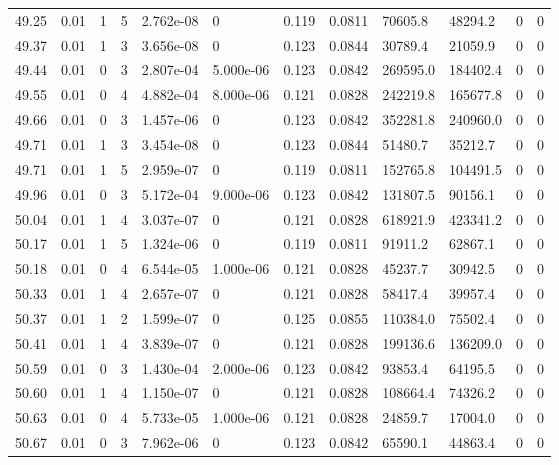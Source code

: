 \documentclass[preview]{standalone}
\begin{document}
{{{{{{{{{{{{{{\begin{tabular}{L{1.2cm}C{1.2cm} C{0.3cm}C{0.5cm} C{1.4cm}C{1.4cm} C{1.4cm}C{1.4cm} C{1.6cm}C{1.6cm} C{1.6cm}C{1.6cm}}
  49.25  &  0.01  & 1     &  5 &  2.762e-08  & 0  &  0.119&   0.0811& 70605.8 & 48294.2   &  0 & 0  \\ 
  49.37  &  0.01  & 1     &  3 &  3.656e-08  & 0  &  0.123&   0.0844& 30789.4 & 21059.9   &  0 & 0  \\ 
  49.44  &  0.01  & 0     &  3 &  2.807e-04  & 5.000e-06  &  0.123&   0.0842& 269595.0 & 184402.4   &  0 & 0  \\ 
  49.55  &  0.01  & 0     &  4 &  4.882e-04  & 8.000e-06  &  0.121&   0.0828& 242219.8 & 165677.8   &  0 & 0  \\ 
  49.66  &  0.01  & 0     &  3 &  1.457e-06  & 0  &  0.123&   0.0842& 352281.8 & 240960.0   &  0 & 0  \\ 
  49.71  &  0.01  & 1     &  3 &  3.454e-08  & 0  &  0.123&   0.0844& 51480.7 & 35212.7   &  0 & 0  \\ 
  49.71  &  0.01  & 1     &  5 &  2.959e-07  & 0  &  0.119&   0.0811& 152765.8 & 104491.5   &  0 & 0  \\ 
  49.96  &  0.01  & 0     &  3 &  5.172e-04  & 9.000e-06  &  0.123&   0.0842& 131807.5 & 90156.1   &  0 & 0  \\ 
  50.04  &  0.01  & 1     &  4 &  3.037e-07  & 0  &  0.121&   0.0828& 618921.9 & 423341.2   &  0 & 0  \\ 
  50.17  &  0.01  & 1     &  5 &  1.324e-06  & 0  &  0.119&   0.0811& 91911.2 & 62867.1   &  0 & 0  \\ 
  50.18  &  0.01  & 0     &  4 &  6.544e-05  & 1.000e-06  &  0.121&   0.0828& 45237.7 & 30942.5   &  0 & 0  \\ 
  50.33  &  0.01  & 1     &  4 &  2.657e-07  & 0  &  0.121&   0.0828& 58417.4 & 39957.4   &  0 & 0  \\ 
  50.37  &  0.01  & 1     &  2 &  1.599e-07  & 0  &  0.125&   0.0855& 110384.0 & 75502.4   &  0 & 0  \\ 
  50.41  &  0.01  & 1     &  4 &  3.839e-07  & 0  &  0.121&   0.0828& 199136.6 & 136209.0   &  0 & 0  \\ 
  50.59  &  0.01  & 0     &  3 &  1.430e-04  & 2.000e-06  &  0.123&   0.0842& 93853.4 & 64195.5   &  0 & 0  \\ 
  50.60  &  0.01  & 1     &  4 &  1.150e-07  & 0  &  0.121&   0.0828& 108664.4 & 74326.2   &  0 & 0  \\ 
  50.63  &  0.01  & 0     &  4 &  5.733e-05  & 1.000e-06  &  0.121&   0.0828& 24859.7 & 17004.0   &  0 & 0  \\ 
  50.67  &  0.01  & 0     &  3 &  7.962e-06  & 0  &  0.123&   0.0842& 65590.1 & 44863.4   &  0 & 0  \\ 

\end{tabular}}}}}}}}}}}}}}}
\end{document}
